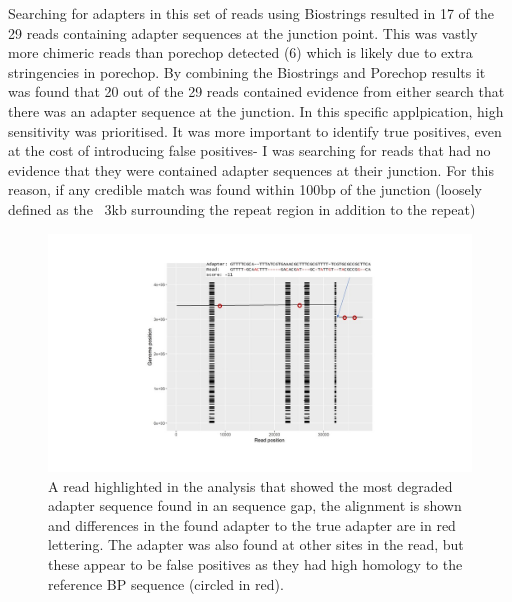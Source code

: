 Searching for adapters in this set of reads using Biostrings resulted in 17 of the 29 reads containing adapter sequences at the junction point. This was vastly more chimeric reads than porechop detected (6) which is likely due to extra stringencies in porechop. By combining the Biostrings and Porechop results it was found that 20 out of the 29 reads contained evidence from either search that there was an adapter sequence at the junction. In this specific applpication, high sensitivity was prioritised. It was more important to identify true positives, even at the cost of introducing false positives- I was searching for reads that had no evidence that they were contained adapter sequences at their junction. For this reason, if any credible match was found within 100bp of the junction (loosely defined as the ~3kb surrounding the repeat region in addition to the repeat)

\begin{figure}[h!]
\centering
\includegraphics[width=\textwidth{}]{Chapter_2/Adapter read1 with FP.jpg}
\caption{ A read highlighted in the analysis that showed the most degraded adapter sequence found in an sequence gap, the alignment is shown and differences in the found adapter to the true adapter are in red lettering. The adapter was also found at other sites in the read, but these appear to be false positives as they had high homology to the reference BP sequence (circled in red).}
\label{fig:Heatmap}
\end{figure}


